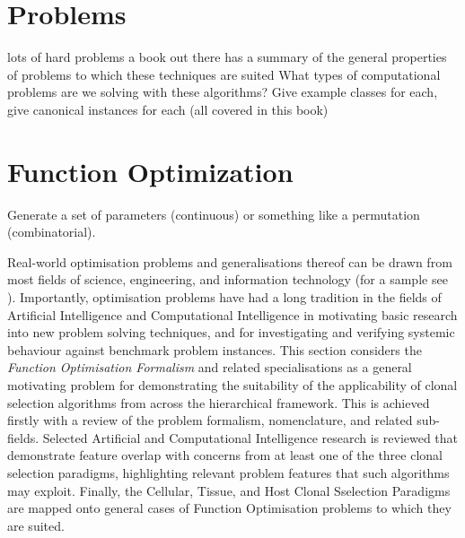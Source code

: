 \documentclass[a4paper, 11pt]{article}
\begin{document}
\section{Problems}
\label{sec:problems}
lots of hard problems
a book out there has a summary of the general properties of problems to which these techniques are suited
What types of computational problems are we solving with these algorithms?
Give example classes for each, give canonical instances for each (all covered in this book)



% 
%
\section{Function Optimization}
Generate a set of parameters (continuous) or something like a permutation (combinatorial).

 
Real-world optimisation problems and generalisations thereof can be drawn from most fields of science, engineering, and information technology (for a sample see \cite{Ali1997, Toern1999}). Importantly, optimisation problems have had a long tradition in the fields of Artificial Intelligence and Computational Intelligence in motivating basic research into new problem solving techniques, and for investigating and verifying systemic behaviour against benchmark problem instances.
This section considers the \emph{Function Optimisation Formalism} and related specialisations as a general motivating problem for demonstrating the suitability of the applicability of clonal selection algorithms from across the hierarchical framework.
This is achieved firstly with a review of the problem formalism, nomenclature, and related sub-fields. Selected Artificial and Computational Intelligence research is reviewed that demonstrate feature overlap with concerns from at least one of the three clonal selection paradigms, highlighting relevant problem features that such algorithms may exploit. Finally, the Cellular, Tissue, and Host Clonal Sselection Paradigms are mapped onto general cases of Function Optimisation problems to which they are suited.

%
%
\end{document}
